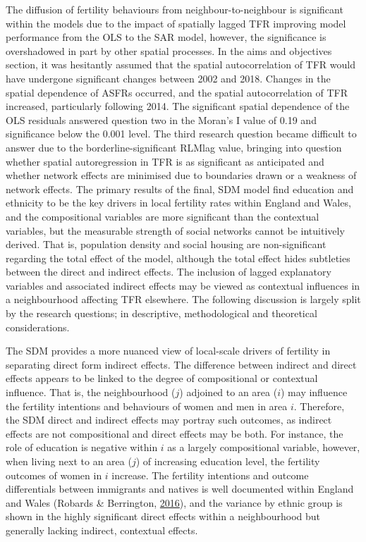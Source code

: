 \documentclass[12pt,twoside]{reedthesis}
\begin{document}
The diffusion of fertility behaviours from neighbour-to-neighbour is significant within the models due to the impact of spatially lagged TFR improving model performance from the OLS to the SAR model, however, the significance is overshadowed in part by other spatial processes. In the aims and objectives section, it was hesitantly assumed that the spatial autocorrelation of TFR would have undergone significant changes between 2002 and 2018. Changes in the spatial dependence of ASFRs occurred, and the spatial autocorrelation of TFR increased, particularly following 2014. The significant spatial dependence of the OLS residuals answered question two in the Moran's I value of 0.19 and significance below the 0.001 level. The third research question became difficult to answer due to the borderline-significant RLMlag value, bringing into question whether spatial autoregression in TFR is as significant as anticipated and whether network effects are minimised due to boundaries drawn or a weakness of network effects. The primary results of the final, SDM model find education and ethnicity to be the key drivers in local fertility rates within England and Wales, and the compositional variables are more significant than the contextual variables, but the measurable strength of social networks cannot be intuitively derived. That is, population density and social housing are non-significant regarding the total effect of the model, although the total effect hides subtleties between the direct and indirect effects. The inclusion of lagged explanatory variables and associated indirect effects may be viewed as contextual influences in a neighbourhood affecting TFR elsewhere. The following discussion is largely split by the research questions; in descriptive, methodological and theoretical considerations.

The SDM provides a more nuanced view of local-scale drivers of fertility in separating direct form indirect effects. The difference between indirect and direct effects appears to be linked to the degree of compositional or contextual influence. That is, the neighbourhood (\(j\)) adjoined to an area (\(i\)) may influence the fertility intentions and behaviours of women and men in area \(i\). Therefore, the SDM direct and indirect effects may portray such outcomes, as indirect effects are not compositional and direct effects may be both. For instance, the role of education is negative within \(i\) as a largely compositional variable, however, when living next to an area (\(j\)) of increasing education level, the fertility outcomes of women in \(i\) increase. The fertility intentions and outcome differentials between immigrants and natives is well documented within England and Wales (Robards \& Berrington, \protect\hyperlink{ref-robards2016}{2016}), and the variance by ethnic group is shown in the highly significant direct effects within a neighbourhood but generally lacking indirect, contextual effects.
\end{document}
